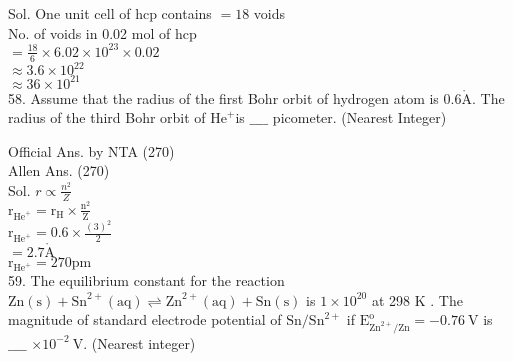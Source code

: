 \documentclass[10pt]{article}
\def\AA{\mathring{\mathrm{A}}}
\begin{document}
Sol. One unit cell of hcp contains \(=18\) voids\\
No. of voids in 0.02 mol of hcp\\
\(=\frac{18}{6} \times 6.02 \times 10^{23} \times 0.02\)\\
\(\approx 3.6 \times 10^{22}\)\\
\(\approx 36 \times 10^{21}\)\\
58. Assume that the radius of the first Bohr orbit of hydrogen atom is \(0.6 \AA\). The radius of the third Bohr orbit of \(\mathrm{He}^{+}\)is \(\_\_\_\_\) picometer. (Nearest Integer)

Official Ans. by NTA (270)\\
Allen Ans. (270)\\
Sol. \(r \propto \frac{n^{2}}{Z}\)\\
\(\mathrm{r}_{\mathrm{He}^{+}}=\mathrm{r}_{\mathrm{H}} \times \frac{\mathrm{n}^{2}}{\mathrm{Z}}\)\\
\(\mathrm{r}_{\mathrm{He}^{+}}=0.6 \times \frac{(3)^{2}}{2}\)\\
\(=2.7 \AA\)\\
\(\mathrm{r}_{\mathrm{He}^{+}}=270 \mathrm{pm}\)\\
59. The equilibrium constant for the reaction\\
\(\mathrm{Zn}(\mathrm{s})+\mathrm{Sn}^{2+}(\mathrm{aq}) \rightleftharpoons \mathrm{Zn}^{2+}(\mathrm{aq})+\mathrm{Sn}(\mathrm{s})\) is \(1 \times 10^{20}\) at 298 K . The magnitude of standard electrode potential of \(\mathrm{Sn} / \mathrm{Sn}^{2+}\) if \(\mathrm{E}_{\mathrm{Zn}^{2+} / \mathrm{Zn}}^{\mathrm{o}}=-0.76 \mathrm{~V}\) is\\
\(\_\_\_\_\) \(\times 10^{-2} \mathrm{~V}\). (Nearest integer)
\end{document}
